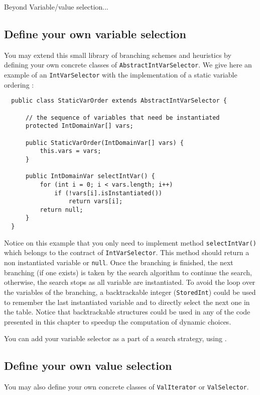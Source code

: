 Beyond Variable/value selection...

\subsection{Define your own variable selection}\label{advanced:defineyourownvariableselection}\hypertarget{advanced:defineyourownvariableselection}{}
You may extend this small library of branching schemes and heuristics by defining your own concrete classes of \texttt{AbstractIntVarSelector}. We give here an example of an \texttt{IntVarSelector} with the implementation of a static variable ordering :
\begin{lstlisting}
  public class StaticVarOrder extends AbstractIntVarSelector {

      // the sequence of variables that need be instantiated
	  protected IntDomainVar[] vars;
	
	  public StaticVarOrder(IntDomainVar[] vars) {
          this.vars = vars;
	  }
	
	  public IntDomainVar selectIntVar() {
          for (int i = 0; i < vars.length; i++)
              if (!vars[i].isInstantiated())
                  return vars[i];
          return null;
	  }
  }
\end{lstlisting}

Notice on this example that you only need to implement method \texttt{selectIntVar()} which belongs to the contract of \texttt{IntVarSelector}. This method should return a non instantiated variable or \texttt{null}. Once the branching is finished, the next branching (if one exists) is taken by the search algorithm to continue the search, otherwise, the search stops as all variable are instantiated. To avoid the loop over the variables of the branching, a backtrackable integer (\texttt{StoredInt}) could be used to remember the last instantiated variable and to directly select the next one in the table. Notice that backtrackable structures could be used in any of the code presented in this chapter to speedup the computation of dynamic choices.

You can add your variable selector as a part of a search strategy, using .

\subsection{Define your own value selection}\label{advanced:defineyourownvalueselection}\hypertarget{advanced:defineyourownvalueselection}{}
You may also define your own concrete classes of \texttt{ValIterator} or \texttt{ValSelector}. 


